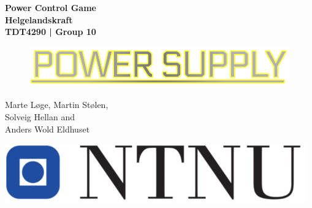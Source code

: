 \begin{titlepage}
\begin{center}

{\Huge \bf Power Control Game} \\[1.0cm]
{\Huge \bf Helgelandskraft} \\[1.0cm]
{\Large \bf TDT4290 | Group 10} \\[1.0cm]

\vspace{2cm}

\begin{figure}[!ht]
	\centering
	\includegraphics[scale=0.45]{pictures/newLogo.png}
\end{figure}
\vspace{6cm}

{Marte Løge, Martin Stølen, \\
Solveig Hellan and \\
Anders Wold Eldhuset}

\vspace{1cm}

\includegraphics[scale=0.2]{pictures/ntnu.jpg}


\end{center}
\end{titlepage}